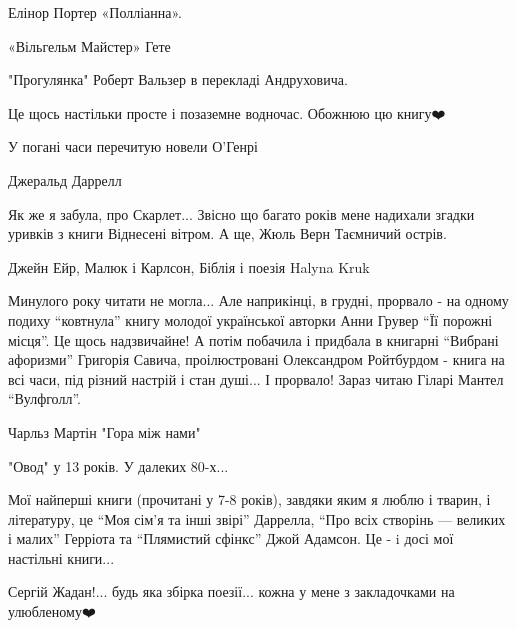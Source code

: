 
Елінор Портер «Полліанна».


«Вільгельм Майстер» Гете


"Прогулянка" Роберт Вальзер в перекладі Андруховича.

Це щось настільки просте і позаземне водночас. Обожнюю цю книгу❤️


У погані часи перечитую новели О'Генрі


Джеральд Даррелл 🙂


Як же я забула, про Скарлет... Звісно що багато років мене надихали згадки
уривків з книги Віднесені вітром. А ще, Жюль Верн Таємничий острів.


Джейн Ейр, Малюк і Карлсон, Біблія і поезія Halyna Kruk


Минулого року читати не могла... Але наприкінці, в грудні, прорвало - на одному
подиху \enquote{ковтнула} книгу молодої української авторки Анни Грувер \enquote{Її порожні
місця}. Це щось надзвичайне! А потім побачила і придбала в книгарні \enquote{Вибрані
афоризми} Григорія Савича, проілюстровані Олександром Ройтбурдом - книга на всі
часи, під різний настрій і стан душі... І прорвало! Зараз читаю Гіларі Мантел
\enquote{Вулфголл}.


Чарльз Мартін "Гора між нами"


"Овод" у 13 років. У далеких 80-х...


Мої найперші книги (прочитані у 7-8 років), завдяки яким я люблю і тварин, і
літературу, це \enquote{Моя сім'я та інші звірі} Даррелла, \enquote{Про всіх створінь — великих
і малих} Герріота та \enquote{Плямистий сфінкс} Джой Адамсон. Це - i досі мої настільні
книги...


Сергій Жадан!... будь яка збірка поезії... кожна у мене з закладочками на улюбленому❤️



